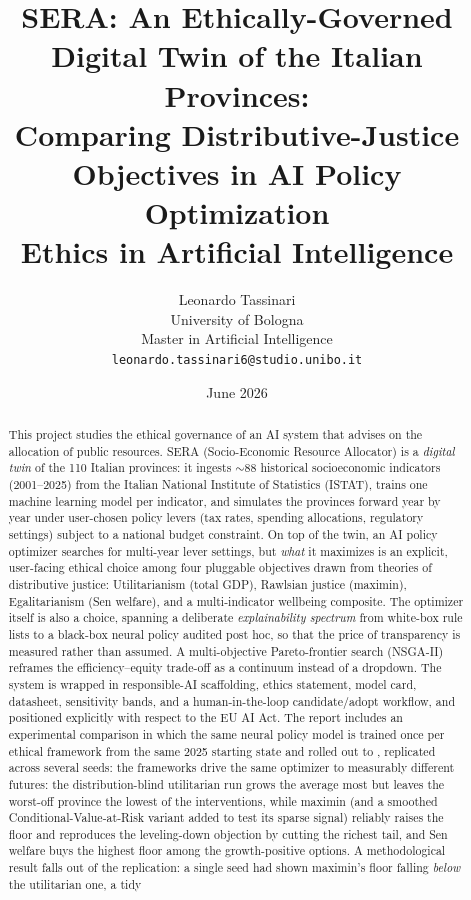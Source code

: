 \documentclass[11pt,a4paper]{article}
\title{\textbf{SERA: An Ethically-Governed Digital Twin of the
Italian Provinces:\\ Comparing Distributive-Justice Objectives in
AI Policy Optimization}\\[1ex]
\large Ethics in Artificial Intelligence}
\author{Leonardo Tassinari\\
University of Bologna\\
Master in Artificial Intelligence\\
\texttt{leonardo.tassinari6@studio.unibo.it}}
\date{June 2026}
\begin{document}
\maketitle

\begin{abstract}
This project studies the ethical governance of an AI system that advises on the
allocation of public resources. SERA (Socio-Economic Resource Allocator) is a \emph{digital twin} of the 110 Italian
provinces: it ingests $\sim$88 historical socioeconomic indicators (2001--2025)
from the Italian National Institute of Statistics (ISTAT), trains one machine
learning model per indicator, and simulates the provinces forward year by year
under user-chosen policy levers (tax rates, spending allocations, regulatory
settings) subject to a national budget constraint. On top of the twin, an AI
policy optimizer searches for multi-year lever settings, but \emph{what} it
maximizes is an explicit, user-facing ethical choice among four pluggable
objectives drawn from theories of distributive justice: Utilitarianism (total
GDP), Rawlsian justice (maximin), Egalitarianism (Sen welfare), and a
multi-indicator wellbeing composite. The optimizer itself is also a choice,
spanning a deliberate \emph{explainability spectrum} from white-box rule lists
to a black-box neural policy audited post hoc, so that the price of transparency
is measured rather than assumed. A multi-objective Pareto-frontier search
(NSGA-II) reframes the efficiency--equity trade-off as a continuum instead of a
dropdown. The system is wrapped in responsible-AI scaffolding, ethics
statement, model card, datasheet, sensitivity bands, and a human-in-the-loop
candidate/adopt workflow, and positioned explicitly with respect to the EU AI
Act. The report includes an experimental comparison in which the same neural
policy model is trained once per ethical framework from the same 2025 starting
state and rolled out to \cmpFinalYear{}, replicated across several seeds: the
frameworks drive the same optimizer to measurably different futures: the
distribution-blind utilitarian run grows the average most but leaves the
worst-off province the lowest of the interventions, while maximin (and a smoothed
Conditional-Value-at-Risk variant added to test its sparse signal) reliably
raises the floor and reproduces the leveling-down objection by cutting the
richest tail, and Sen welfare buys the highest floor among the growth-positive
options. A methodological result falls out of the replication: a single seed
had shown maximin's floor falling \emph{below} the utilitarian one, a tidy

\end{abstract}
\end{document}
